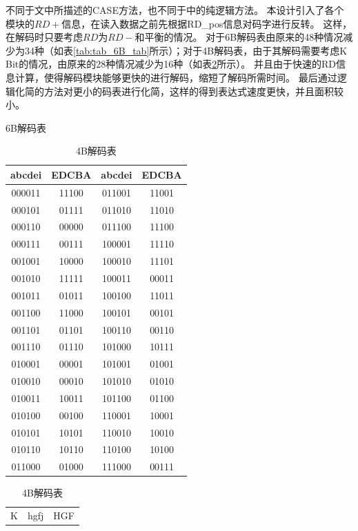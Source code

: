 \documentclass[UTF8]{ctexart}
\begin{document}
不同于\cite{Actel1998}文中所描述的CASE方法，也不同于\cite{Widmer1983}中的纯逻辑方法。
本设计引入了各个模块的$RD+$信息，在读入数据之前先根据RD\_pos信息对码字进行反转。
这样，在解码时只要考虑$RD$为$RD-$和平衡的情况。
对于6B解码表由原来的48种情况减少为34种（如表\ref{tab:tab_6B_tab}所示）；对于4B解码表，由于其解码需要考虑K Bit的情况，由原来的28种情况减少为16种（如表\ref{tab:tab_4B_tab}所示）。
并且由于快速的RD信息计算，使得解码模块能够更快的进行解码，缩短了解码所需时间。
最后通过逻辑化简的方法对更小的码表进行化简，这样的得到表达式速度更快，并且面积较小。

\begin{table}[H]
\begin{minipage}[t]{.5\textwidth}
\centering
\caption{6B解码表}
\label{tab:tab_6B_tab}
\begin{tabular}{|c|c|c|c|}
\hline
	abcdei	&	EDCBA	&	abcdei	&	EDCBA	\\
\hline
	000011	&	11100	&	011001	&	11001	\\
	000101	&	01111	&	011010	&	11010	\\
	000110	&	00000	&	011100	&	11100	\\
	000111	&	00111	&	100001	&	11110 	\\
	001001	&	10000	&	100010	&	11101 	\\
	001010	&	11111	&	100011	&	00011 	\\
	001011	&	01011	&	100100	&	11011 	\\
	001100	&	11000	&	100101	&	00101 	\\
	001101	&	01101	&	100110	&	00110 	\\
	001110	&	01110	&	101000	&	10111 	\\
	010001	&	00001	&	101001	&	01001 	\\
	010010	&	00010	&	101010	&	01010 	\\
	010011	&	10011	&	101100	&	01100 	\\
	010100	&	00100	&	110001	&	10001 	\\
	010101	&	10101	&	110010	&	10010 	\\
	010110	&	10110	&	110100	&	10100 	\\
	011000	&	01000	&	111000	&	00111 	\\
\hline
\end{tabular}
\end{minipage}
\begin{minipage}[t]{.5\textwidth}
\centering
\caption{4B解码表}
\label{tab:tab_4B_tab}
\begin{tabular}{|c|c|c|}
\hline
	K	&	hgfj	&	HGF	\\

\end{tabular}
\end{minipage}
\end{table}
\end{document}
